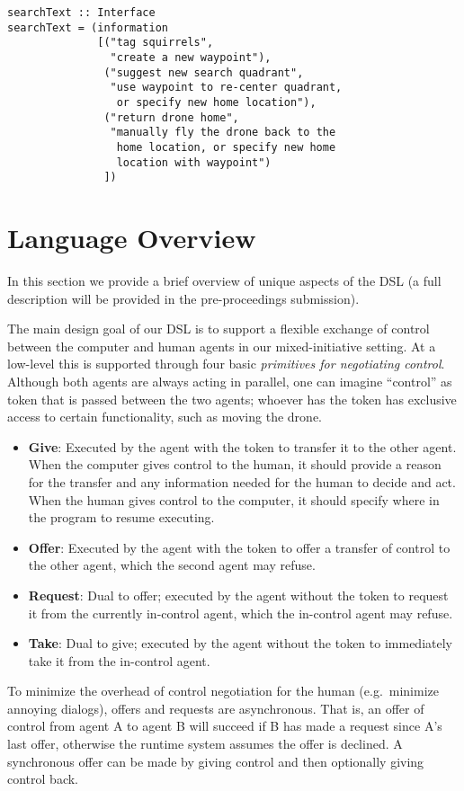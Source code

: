\documentclass{sig-alternate-05-2015}
\begin{document}
\begin{lstlisting}
searchText :: Interface
searchText = (information
              [("tag squirrels",
                "create a new waypoint"),
               ("suggest new search quadrant",
                "use waypoint to re-center quadrant,
                 or specify new home location"),
               ("return drone home",
                "manually fly the drone back to the
                 home location, or specify new home
                 location with waypoint")
               ])
\end{lstlisting}

\section{Language Overview}
\label{sec:lang}

In this section we provide a brief overview of unique aspects of the DSL (a
full description will be provided in the pre-proceedings submission).

The main design goal of our DSL is to support a flexible exchange of control
between the computer and human agents in our mixed-initiative setting. At a
low-level this is supported through four basic \emph{primitives for negotiating
control}. Although both agents are always acting in parallel, one can imagine
``control'' as token that is passed between the two agents; whoever has the
token has exclusive access to certain functionality, such as moving the drone.
%
\begin{itemize}
%
\item \textbf{Give}: Executed by the agent with the token to transfer it to the
other agent. When the computer gives control to the human, it should provide a
reason for the transfer and any information needed for the human to decide and
act. When the human gives control to the computer, it should specify where in
the program to resume executing.
%
\item \textbf{Offer}: Executed by the agent with the token to offer a transfer
of control to the other agent, which the second agent may refuse.
%
\item \textbf{Request}: Dual to offer; executed by the agent without the token
to request it from the currently in-control agent, which the in-control agent
may refuse.
%
\item \textbf{Take}: Dual to give; executed by the agent without the token to
immediately take it from the in-control agent.
%
\end{itemize}
%
To minimize the overhead of control negotiation for the human (e.g.\ minimize
annoying dialogs), offers and requests are asynchronous. That is, an offer of
control from agent A to agent B will succeed if B has made a request since A's
last offer, otherwise the runtime system assumes the offer is declined.
%
A synchronous offer can be made by giving control and then optionally giving
control back.
\end{document}
